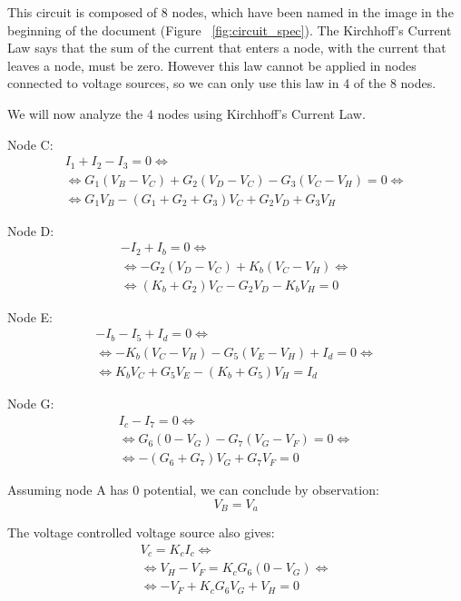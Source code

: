 \hspace{12pt} This circuit is composed of 8 nodes, which have been named in the image in the beginning of the document (Figure ~\ref{fig:circuit_spec}). The Kirchhoff's Current Law says that the sum of the current that enters a node, with the current that leaves a node, must be zero. However this law cannot be applied in nodes connected to voltage sources, so we can only use this law in 4 of the 8 nodes.

We will now analyze the 4 nodes using Kirchhoff's Current Law.


\vspace{10pt}
Node C:
\begin{gather}
    I_1+I_2-I_3=0 \iff \nonumber \\ 
    \iff G_1(V_B-V_C)+G_2(V_D-V_C)-G_3(V_C-V_H)=0 \iff \\
    \iff G_1V_B-(G_1+G_2+G_3)V_C+G_2V_D+G_3V_H \nonumber
\end{gather}

Node D:
\begin{gather}
    -I_2+I_b=0 \iff \nonumber \\
    \iff -G_2(V_D-V_C)+K_b(V_C-V_H) \iff \\
    \iff (K_b+G_2)V_C-G_2V_D-K_bV_H=0 \nonumber
\end{gather}

Node E:
\begin{gather}
    -I_b-I_5+I_d=0 \iff \nonumber \\
    \iff -K_b(V_C-V_H)-G_5(V_E-V_H)+I_d=0 \iff \\
    \iff K_bV_C+G_5V_E-(K_b+G_5)V_H=I_d \nonumber
\end{gather}

Node G:
\begin{gather}
    I_c-I_7=0 \iff \nonumber \\
    \iff G_6(0-V_G)-G_7(V_G-V_F)=0 \iff \\
    \iff -(G_6+G_7)V_G+G_7V_F=0 \nonumber
\end{gather}
\vspace{5pt}

Assuming node A has 0 potential, we can conclude by observation:
\begin{equation}
    V_B=V_a
\end{equation}
\vspace{5pt}

The voltage controlled voltage source also gives:
\begin{gather}
    V_c=K_cI_c \iff \nonumber \\
    \iff V_H-V_F=K_cG_6(0-V_G) \iff \\
    \iff -V_F+K_cG_6V_G+V_H=0 \nonumber
\end{gather}
\vspace{5pt}

